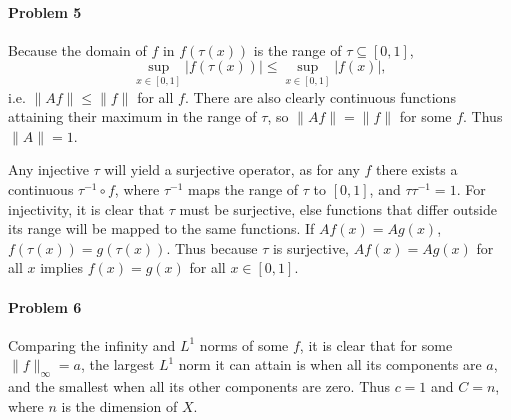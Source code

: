 \documentclass[12pt]{article}
\begin{document}
\paragraph{Problem 5}

Because the domain of $f$ in $f(\tau(x))$ is the range of $\tau \subseteq [0,1]$,
\[\sup_{x\in [0,1]}|f(\tau(x))| \leq \sup_{x\in [0,1]}|f(x)|,\] i.e. $\|Af\| \leq
\|f\|$ for all $f$. There are also clearly continuous functions attaining their
maximum in the range of $\tau$, so $\|Af\| = \|f\|$ for some $f$. Thus $\|A\|
=1$.

Any injective $\tau$ will yield a surjective operator, as for any $f$ there
exists a continuous $\tau^{-1}\circ f$, where $\tau^{-1}$ maps the range of $\tau$
to $[0,1]$, and $\tau\tau^{-1} = 1$. For injectivity, it is clear that $\tau$
must be surjective, else functions that differ outside its range will be mapped
to the same functions. If $Af(x) = Ag(x)$, $f(\tau(x)) = g(\tau(x))$. Thus
because $\tau$ is surjective, $Af(x) = Ag(x)$ for all $x$ implies $f(x) = g(x)$
for all $x \in [0,1]$.

\paragraph{Problem 6}
Comparing the infinity and $L^1$ norms of some $f$, it is clear that for some
$\|f\|_\infty = a$, the largest $L^1$ norm it can attain is when all its
components are $a$, and the smallest when all its other components are zero.
Thus $c = 1$ and $C = n$, where $n$ is the dimension of $X$.
\end{document}

